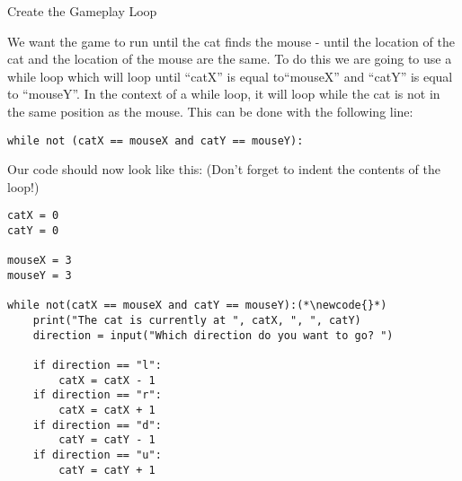 \documentclass[12pt,oneside]{article}
\newcommand{\q}[1]{``#1''}
\newcommand{\subsectitle}[1]{
  \begin{flushleft}{\large#1}\end{flushleft}
}
\newcommand{\newcode}[0]{\hfill<--}
\begin{document}
\begin{minipage}{\textwidth}
\subsectitle{Create the Gameplay Loop}
We want the game to run until the cat finds the mouse - until the location of the cat and the location of the mouse are the same. To do this we are going to use a while loop which will loop until \q{catX} is equal to\q{mouseX} and \q{catY} is equal to \q{mouseY}. In the context of a while loop, it will loop while the cat is not in the same position as the mouse. This can be done with the following line:

\begin{lstlisting}
while not (catX == mouseX and catY == mouseY):
\end{lstlisting}

Our code should now look like this: (Don't forget to indent the contents of the loop!)

\begin{lstlisting}
catX = 0
catY = 0

mouseX = 3
mouseY = 3

while not(catX == mouseX and catY == mouseY):(*\newcode{}*)
    print("The cat is currently at ", catX, ", ", catY)
    direction = input("Which direction do you want to go? ")
    
    if direction == "l":
        catX = catX - 1
    if direction == "r":
        catX = catX + 1
    if direction == "d":
        catY = catY - 1
    if direction == "u":
        catY = catY + 1
\end{lstlisting}
\end{minipage}
\end{document}

